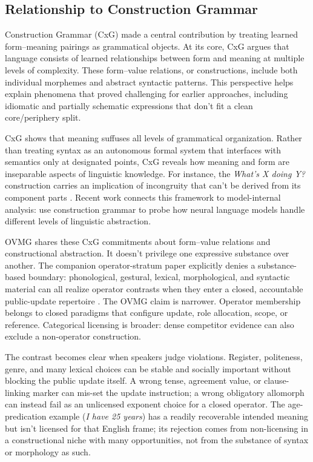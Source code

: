 \documentclass[12pt,letterpaper]{article}
\newcommand{\mention}[1]{\textit{#1}}
\begin{document}
\subsection{Relationship to Construction Grammar}

Construction Grammar (CxG) \autocite{fillmore1988mechanisms, fillmore1988, kay1999grammatical, goldberg1995constructions, goldberg2019, sag2012sign} made a central contribution by treating learned form--meaning pairings as grammatical objects. At its core, CxG argues that language consists of learned relationships between form and meaning at multiple levels of complexity. These form--value relations, or constructions, include both individual morphemes and abstract syntactic patterns. This perspective helps explain phenomena that proved challenging for earlier approaches, including idiomatic and partially schematic expressions that don't fit a clean core/periphery split.

CxG shows that meaning suffuses all levels of grammatical organization. Rather than treating syntax as an autonomous formal system that interfaces with semantics only at designated points, CxG reveals how meaning and form are inseparable aspects of linguistic knowledge. For instance, the \mention{What's X doing Y?} construction carries an implication of incongruity that can't be derived from its component parts \autocite{kay1999grammatical}. Recent work connects this framework to model-internal analysis: \textcite{weissweiler2023construction} use construction grammar to probe how neural language models handle different levels of linguistic abstraction.

OVMG shares these CxG commitments about form--value relations and constructional
abstraction. It doesn't privilege one expressive substance over another. The
companion operator-stratum paper explicitly denies a substance-based boundary:
phonological, gestural, lexical, morphological, and syntactic material can all
realize operator contrasts when they enter a closed, accountable public-update
repertoire \autocite{reynolds2026operators}. The OVMG claim is narrower.
Operator membership belongs to closed paradigms that configure update, role
allocation, scope, or reference. Categorical licensing is broader: dense
competitor evidence can also exclude a non-operator construction.

The contrast becomes clear when speakers judge violations. Register, politeness,
genre, and many lexical choices can be stable and socially important without
blocking the public update itself. A wrong tense, agreement value, or
clause-linking marker can mis-set the update instruction; a wrong obligatory
allomorph can instead fail as an unlicensed exponent choice for a closed
operator. The age-predication example (\mention{I have 25 years}) has a readily recoverable intended meaning
but isn't licensed for that English frame; its rejection comes from non-licensing
in a constructional niche with many opportunities, not from the substance of syntax or
morphology as such.
\end{document}

